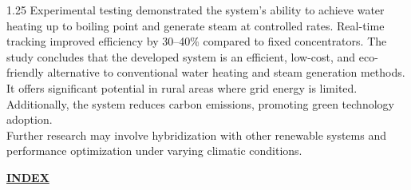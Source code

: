 \documentclass[12pt,a4paper]{article}
\begin{document}
\begin{spacing}{1.25}
{Experimental testing demonstrated the system's ability to achieve water heating up to boiling point and generate steam at controlled rates. Real-time tracking improved efficiency by 30--40\% compared to fixed concentrators. The study concludes that the developed system is an efficient, low-cost, and eco-friendly alternative to conventional water heating and steam generation methods. It offers significant potential in rural areas where grid energy is limited. Additionally, the system reduces carbon emissions, promoting green technology adoption.\\[2.5mm]
Further research may involve hybridization with other renewable systems and performance optimization under varying climatic conditions.
}
\end{spacing}
\clearpage




\setcounter{page}{1}
\pagestyle{fancy}

\vspace*{-2mm}
\begin{center}
  {\fontsize{16}{20}\selectfont \bfseries \textcolor{red!80!black}{\underline{INDEX}}}\\[6mm]
\end{center}
\end{document}
